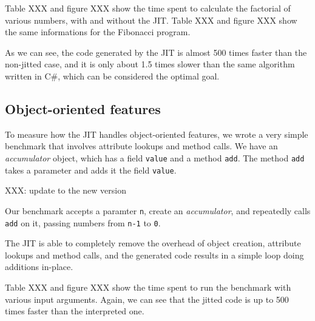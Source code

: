 Table XXX and figure XXX show the time spent to calculate the factorial of
various numbers, with and without the JIT.  Table XXX and figure XXX show the
same informations for the Fibonacci program.


As we can see, the code generated by the JIT is almost 500 times faster than
the non-jitted case, and it is only about 1.5 times slower than the same
algorithm written in C\#, which can be considered the optimal goal.

\subsection{Object-oriented features}

To measure how the JIT handles object-oriented features, we wrote a very
simple benchmark that involves attribute lookups and method calls.  We have an
\emph{accumulator} object, which has a field \lstinline{value} and a method
\lstinline{add}.  The method \lstinline{add} takes a parameter and adds it the
field \lstinline{value}.

XXX: update to the new version

Our benchmark accepts a paramter \lstinline{n}, create an \emph{accumulator},
and repeatedly calls \lstinline{add} on it, passing numbers from
\lstinline{n-1} to \lstinline{0}.

The JIT is able to completely remove the overhead of object creation,
attribute lookups and method calls, and the generated code results in a simple
loop doing additions in-place.

Table XXX and figure XXX show the time spent to run the benchmark with various
input arguments. Again, we can see that the jitted code is up to 500 times
faster than the interpreted one.
